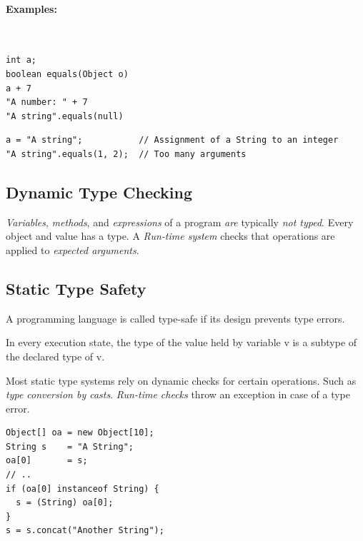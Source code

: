 \paragraph{Examples: } $\text{}$
\begin{lstlisting}[caption=compiles]
int a;
boolean equals(Object o)
a + 7
"A number: " + 7
"A string".equals(null)
\end{lstlisting}
\begin{lstlisting}[caption=results in compile-time errors]
a = "A string";           // Assignment of a String to an integer
"A string".equals(1, 2);  // Too many arguments
\end{lstlisting}

\subsection{Dynamic Type Checking}
\emph{Variables}, \emph{methods}, and \emph{expressions} of a program \emph{are} typically \emph{not typed}. Every object and value has a type. A \emph{Run-time system} checks that operations are applied to \emph{expected arguments}.

\subsection{Static Type Safety}
\begin{definition}
 A programming language is called type-safe if its design prevents type errors. 
\end{definition}
\begin{shadequote}
 In every execution state, the type of the value held by variable v is a subtype of the declared type of v.
\end{shadequote}
Most static type systems rely on dynamic checks for certain operations. Such as \emph{type conversion by casts}. \emph{Run-time checks} throw an exception in case of a type error.

\begin{lstlisting}[caption=Java example on a dynamic check]
Object[] oa = new Object[10];
String s    = "A String";
oa[0]       = s;
// ..
if (oa[0] instanceof String) {
  s = (String) oa[0];
}
s = s.concat("Another String");
\end{lstlisting}

